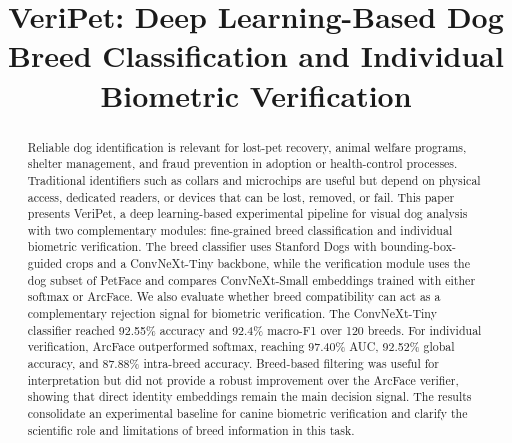 \documentclass[conference]{IEEEtran}
\begin{document}
\title{VeriPet: Deep Learning-Based Dog Breed Classification and Individual Biometric Verification}

\author{
\and
{}
}

\maketitle

\begin{abstract}
Reliable dog identification is relevant for lost-pet recovery, animal welfare programs, shelter management, and fraud prevention in adoption or health-control processes. Traditional identifiers such as collars and microchips are useful but depend on physical access, dedicated readers, or devices that can be lost, removed, or fail. This paper presents VeriPet, a deep learning-based experimental pipeline for visual dog analysis with two complementary modules: fine-grained breed classification and individual biometric verification. The breed classifier uses Stanford Dogs with bounding-box-guided crops and a ConvNeXt-Tiny backbone, while the verification module uses the dog subset of PetFace and compares ConvNeXt-Small embeddings trained with either softmax or ArcFace. We also evaluate whether breed compatibility can act as a complementary rejection signal for biometric verification. The ConvNeXt-Tiny classifier reached 92.55\% accuracy and 92.4\% macro-F1 over 120 breeds. For individual verification, ArcFace outperformed softmax, reaching 97.40\% AUC, 92.52\% global accuracy, and 87.88\% intra-breed accuracy. Breed-based filtering was useful for interpretation but did not provide a robust improvement over the ArcFace verifier, showing that direct identity embeddings remain the main decision signal. The results consolidate an experimental baseline for canine biometric verification and clarify the scientific role and limitations of breed information in this task.
\end{abstract}
\end{document}
